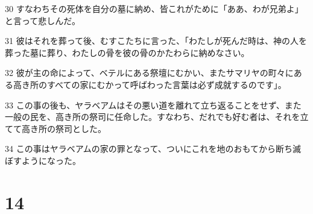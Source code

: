 \par 30 すなわちその死体を自分の墓に納め、皆これがために「ああ、わが兄弟よ」と言って悲しんだ。
\par 31 彼はそれを葬って後、むすこたちに言った、「わたしが死んだ時は、神の人を葬った墓に葬り、わたしの骨を彼の骨のかたわらに納めなさい。
\par 32 彼が主の命によって、ベテルにある祭壇にむかい、またサマリヤの町々にある高き所のすべての家にむかって呼ばわった言葉は必ず成就するのです」。
\par 33 この事の後も、ヤラベアムはその悪い道を離れて立ち返ることをせず、また一般の民を、高き所の祭司に任命した。すなわち、だれでも好む者は、それを立てて高き所の祭司とした。
\par 34 この事はヤラベアムの家の罪となって、ついにこれを地のおもてから断ち滅ぼすようになった。

\chapter{14}

